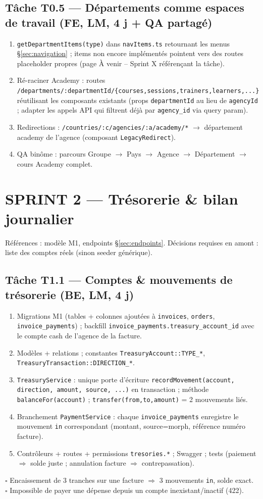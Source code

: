 \documentclass[11pt,a4paper]{article}
\newcommand{\tache}[2]{\subsection{Tâche #1 --- #2}\label{task:#1}}
\newcommand{\critere}{$\square$ }
\begin{document}
\tache{T0.5}{Départements comme espaces de travail (FE, LM, 4 j + QA partagé)}
\begin{enumerate}[nosep]
  \item \verb|getDepartmentItems(type)| dans \verb|navItems.ts| retournant les menus §\ref{sec:navigation} ; items non encore implémentés pointent vers des routes placeholder propres (page \og À venir -- Sprint X \fg{} référençant la tâche).
  \item Ré-raciner Academy : routes \verb|/departments/:departmentId/{courses,sessions,trainers,learners,...}| réutilisant les composants existants (props \verb|departmentId| au lieu de \verb|agencyId| ; adapter les appels API qui filtrent déjà par \verb|agency_id| via query param).
  \item Redirections : \verb|/countries/:c/agencies/:a/academy/*| $\rightarrow$ département academy de l'agence (composant \verb|LegacyRedirect|).
  \item QA binôme : parcours Groupe $\rightarrow$ Pays $\rightarrow$ Agence $\rightarrow$ Département $\rightarrow$ cours Academy complet.
\end{enumerate}

\section{SPRINT 2 --- Trésorerie \& bilan journalier}

Références : modèle M1, endpoints §\ref{sec:endpoints}. Décisions requises en amont : liste des comptes réels (sinon seeder générique).

\tache{T1.1}{Comptes \& mouvements de trésorerie (BE, LM, 4 j)}
\begin{enumerate}[nosep]
  \item Migrations M1 (tables + colonnes ajoutées à \verb|invoices|, \verb|orders|, \verb|invoice_payments|) ; backfill \verb|invoice_payments.treasury_account_id| avec le compte cash de l'agence de la facture.
  \item Modèles + relations ; constantes \verb|TreasuryAccount::TYPE_*|, \verb|TreasuryTransaction::DIRECTION_*|.
  \item \verb|TreasuryService| : unique porte d'écriture \verb|recordMovement(account, direction, amount, source, ...)| en transaction ; méthode \verb|balanceFor(account)| ; \verb|transfer(from,to,amount)| = 2 mouvements liés.
  \item Branchement \verb|PaymentService| : chaque \verb|invoice_payments| enregistre le mouvement \verb|in| correspondant (montant, source=morph, référence numéro facture).
  \item Contrôleurs + routes + permissions \verb|tresories.*| ; Swagger ; tests (paiement $\Rightarrow$ solde juste ; annulation facture $\Rightarrow$ contrepassation).
\end{enumerate}
\critere Encaissement de 3 tranches sur une facture $\Rightarrow$ 3 mouvements \texttt{in}, solde exact. \\
\critere Impossible de payer une dépense depuis un compte inexistant/inactif (422).
\end{document}
